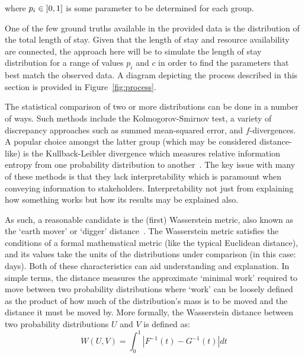 \documentclass[11pt]{article}
\begin{document}
\noindent where \(p_i \in \interval[open left]{0}{1}\) is some parameter to be
determined for each group.

One of the few ground truths available in the provided data is the distribution
of the total length of stay. Given that the length of stay and resource
availability are connected, the approach here will be to simulate the length of
stay distribution for a range of values \(p_i\) and \(c\) in order to find the
parameters that best match the observed data. A diagram depicting the process
described in this section is provided in Figure~\ref{fig:process}.

The statistical comparison of two or more distributions can be done in a number
of ways. Such methods include the Kolmogorov-Smirnov test, a variety of
discrepancy approaches such as summed mean-squared error, and \(f\)-divergences.
A popular choice amongst the latter group (which may be considered
distance-like) is the Kullback-Leibler divergence which measures relative
information entropy from one probability distribution to
another~\cite{Kullback1951}. The key issue with many of these methods is that
they lack interpretability which is paramount when conveying information to
stakeholders. Interpretability not just from explaining how something works but
how its results may be explained also.

As such, a reasonable candidate is the (first) Wasserstein metric, also known as
the `earth mover' or `digger' distance~\cite{Vaserstein1969}. The Wasserstein
metric satisfies the conditions of a formal mathematical metric (like the
typical Euclidean distance), and its values take the units of the distributions
under comparison (in this case: days). Both of these characteristics can aid
understanding and explanation. In simple terms, the distance measures the
approximate `minimal work' required to move between two probability
distributions where `work' can be loosely defined as the product of how much of
the distribution's mass is to be moved and the distance it must be moved
by. More formally, the Wasserstein distance between two probability
distributions \(U\) and \(V\) is defined as:
\begin{equation}\label{eq:wasserstein}
    W(U, V) = \int_{0}^{1} \left\vert F^{-1}(t) - G^{-1}(t) \right\vert dt
\end{equation}
\end{document}
